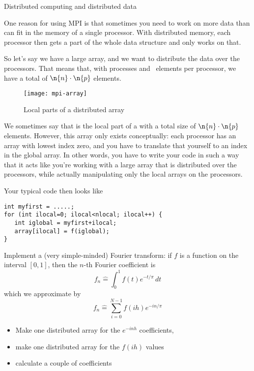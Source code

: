 
 {Distributed computing and distributed data}

One reason for using MPI is that sometimes you need to work on
more data than can fit in the memory of a single processor.
With distributed memory, each processor then gets a part
of the whole data structure and only works on that.

So let's say we have a large array, and we want to
distribute the data over the processors.
That means that, with  processes and ~elements
per processor, we have a total of $\n{n}\cdot\n{p}$ elements.

\begin{figure}[ht]
  \texttt{[image: mpi-array]}
  \caption{Local parts of a distributed array}
  \label{fig:mpi-array}
\end{figure}

We sometimes say that  is the local part
of a  with a total size of
$\n{n}\cdot\n{p}$ elements.
However, this array only exists
conceptually: each processor has an array with lowest index zero,
and you have to translate that yourself to an index in the global
array.
In other words, you have to write your code in such a way that
it acts like you're working with a large array that is distributed
over the processors, while
actually manipulating only the local arrays on the processors.

Your typical code then looks like
\begin{lstlisting}
int myfirst = .....;
for (int ilocal=0; ilocal<nlocal; ilocal++) {
   int iglobal = myfirst+ilocal;
   array[ilocal] = f(iglobal);
}
\end{lstlisting}

\begin{exercise}
  \label{ex:fft-vector}
  Implement a (very simple-minded) Fourier transform: if $f$ is a
  function on the interval $[0,1]$, then the $n$-th Fourier
  coefficient is
  \[ f_n\hat = \int_0^1 f(t)e^{-t/\pi}\,dt \]
  which we approximate by
  \[ f_n\hat = \sum_{i=0}^{N-1} f(ih)e^{-in/\pi} \]
  \begin{itemize}
  \item Make one distributed array for the $e^{-inh}$ coefficients,
  \item make one distributed array for the $f(ih)$ values
  \item calculate a couple of coefficients
  \end{itemize}
\end{exercise}

